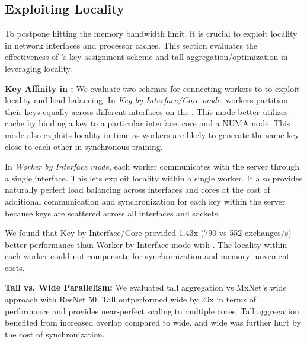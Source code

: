 \subsection{Exploiting Locality}
\label{sec:locality}
To postpone hitting the memory bandwidth limit, it is crucial to exploit locality in network interfaces and processor caches. This section evaluates the effectiveness of \phub{}'s key assignment scheme and tall aggregation/optimization in leveraging locality.

\vspace{0.05in}
\noindent \textbf{Key Affinity in \pbox:}
\label{sec:affinity}
We evaluate two schemes for connecting workers to \pbox to exploit locality and load balancing. In \textit{Key by Interface/Core mode}, workers partition their keys equally across different interfaces on the \pbox. This mode better utilizes cache by binding a key to a particular interface, core and a NUMA node. %
This mode also exploits locality in time as workers are likely to generate the same key close to each other in synchronous training.

In \textit{Worker by Interface mode}, each worker communicates with the server through a single interface. This lets \phub exploit locality within a single worker. It also provides naturally perfect load balancing across interfaces and cores at the cost of additional communication and synchronization for each key within the server because keys are scattered across all interfaces and sockets.

We found that Key by Interface/Core provided 1.43x (790 vs 552 exchanges/s) better performance than Worker by Interface mode with . The locality within each worker could not compensate for synchronization and memory movement costs.


\vspace{0.05in}
\noindent \textbf{Tall vs. Wide Parallelism:}
We evaluated tall aggregation vs MxNet{}'s wide approach with ResNet 50. Tall outperformed wide by 20x in terms of performance  and provides near-perfect scaling to multiple cores. Tall aggregation benefited from increased overlap compared to wide, and wide was further hurt by the cost of synchronization.

